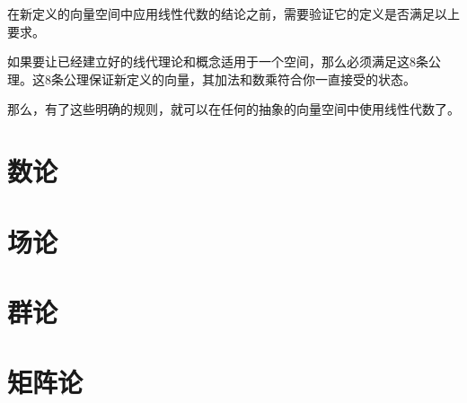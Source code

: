 \documentclass[UTF8]{ctexbook}
\begin{document}
{{{{在新定义的向量空间中应用线性代数的结论之前，需要验证它的定义是否满足以上要求。

如果要让已经建立好的线代理论和概念适用于一个空间，那么必须满足这8条公理。这8条公理保证新定义的向量，其加法和数乘符合你一直接受的状态。

那么，有了这些明确的规则，就可以在任何{}的抽象的向量空间中使用线性代数了。
}%

}%

}%

\section{数论}{

 }%

\section{场论}{

 }%

\section{群论}{

 }%

\section{矩阵论}{

 }%

}%
\end{document}
